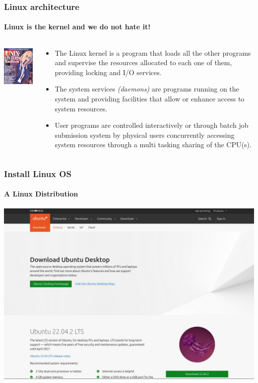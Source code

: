 \documentclass[unknownkeysallowed, 10pt, a4 paper, handout]{beamer}
\begin{document}
\begin{frame}[label=architecture]
  \frametitle{Linux architecture}
  \framesubtitle{Linux is the kernel and we do not hate it!}
  \begin{columns}[T]
    \begin{column}{.23\textwidth}
      \vspace{7mm}
      \includegraphics[scale=0.5]{pics/UNIX-HATERS_Handbook_cover_ISBN_1-56884-203-1.png}
    \end{column}
    \begin{column}{.73\textwidth}
      \begin{itemize}
      \item The Linux kernel is a program that loads all the other programs and
        supervise the resources allocated to each one of them, providing
        locking and I/O services.
      \item The system services \emph{(daemons)} are programs running on the
        system and providing facilities that allow or enhance access to system
        resources.
      \item User programs are controlled interactively or through batch job
        submission system by physical users concurrently accessing system
        resources through a multi tasking sharing of the CPU(s).
    \end{itemize}
    \end{column}
  \end{columns}
\end{frame}


\begin{frame}[label=linux]
  \frametitle{Install Linux OS}
  \framesubtitle{A Linux Distribution}
  \begin{center}
    \includegraphics[scale=0.25]{pics/ubuntu.png}
  \end{center}
\end{frame}
\end{document}
